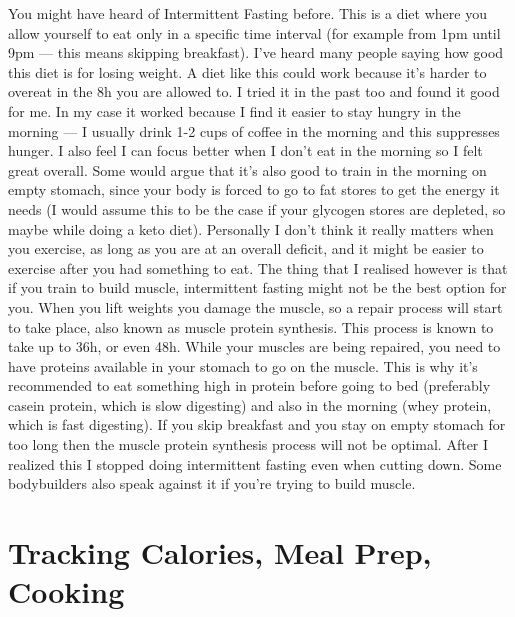 \documentclass[openany, 12pt]{book}
\begin{document}
        You might have heard of Intermittent Fasting
        before. This is a diet where you allow yourself to eat only in a specific time interval (for example from 1pm until 9pm --- this means skipping breakfast).
        I've heard many people saying how good this diet is for losing weight. A diet like this could work because it's harder to overeat in the 8h you are allowed to.
        I tried it in the past too and found it good for me. In my case it worked because I find it easier to stay hungry in the morning --- I usually drink 1-2 cups of coffee
        in the morning and this suppresses hunger. I also feel I can focus better when I don't eat in the morning so I felt great overall. Some would argue that it's also good
        to train in the morning on empty stomach, since your body is forced to go to fat stores to get the energy it needs (I would assume this to be the case if your glycogen
        stores are depleted, so maybe while doing a keto diet). Personally I don't think it really matters when you exercise, as long as you are at an overall deficit, and it
        might be easier to exercise after you had something to eat. The thing that I realised however is that if you train to build muscle, intermittent fasting might
        not be the best option for you. When you lift weights you damage the muscle, so a repair process will start to take place, also known as muscle protein synthesis.
        This process is known to take up to 36h, or even 48h. While your muscles are being repaired, you
        need to have proteins available in your stomach to go on the muscle. This is why it's recommended to eat something high in protein before going to bed (preferably casein
        protein, which is slow digesting) and also in the morning (whey protein, which is fast digesting). If you skip breakfast and you stay on empty stomach for too long
        then the muscle protein synthesis process will not be optimal. After I realized this I stopped doing intermittent fasting even when cutting down. Some bodybuilders
        also speak against it if you're trying to build muscle.

        \section{Tracking Calories, Meal Prep, Cooking}
\end{document}
